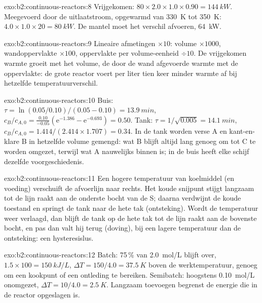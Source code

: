 \begin{solution}{exo:b2:continuous-reactors:8}
Vrijgekomen: $80 \times 2.0 \times 1.0 \times 0.90 = \qty{144}{kW}$. Meegevoerd door de
uitlaatstroom, opgewarmd van \qty{330}{K} tot \qty{350}{K}: $4.0 \times 1.0 \times 20 =
\qty{80}{kW}$. De mantel moet het verschil afvoeren, \qty{64}{kW}.
\end{solution}

\begin{solution}{exo:b2:continuous-reactors:9}
Lineaire afmetingen $\times 10$: volume $\times 1000$, wandoppervlakte $\times 100$, oppervlakte
per volume-eenheid $\div 10$. De vrijgekomen warmte groeit met het volume, de
door de wand afgevoerde warmte met de oppervlakte: de grote reactor voert per liter
tien keer minder warmte af bij hetzelfde temperatuurverschil.
\end{solution}

\begin{solution}{exo:b2:continuous-reactors:10}
Buis: $\tau = \ln(0.05/0.10)/(0.05 - 0.10) = \qty{13.9}{min}$, $c_B/c_{A,0} =
\frac{0.10}{-0.05}(\mathrm e^{-1.386} - \mathrm e^{-0.693}) = 0.50$. Tank: $\tau =
1/\sqrt{0.005} = \qty{14.1}{min}$, $c_B/c_{A,0} = 1.414/(2.414 \times 1.707) =
0.34$. In de tank worden verse A en kant-en-klare B in hetzelfde volume gemengd: wat
B blijft altijd lang genoeg om tot C te worden omgezet, terwijl wat A nauwelijks
binnen is; in de buis heeft elke schijf dezelfde voorgeschiedenis.
\end{solution}

\begin{solution}{exo:b2:continuous-reactors:11}
Een hogere temperatuur van koelmiddel (en voeding) verschuift de afvoerlijn naar
rechts. Het koude snijpunt stijgt langzaam tot de lijn raakt aan
de onderste bocht van de S; daarna verdwijnt de koude toestand en springt de tank
naar de hete tak (ontsteking). Wordt de temperatuur weer verlaagd, dan blijft de tank
op de hete tak tot de lijn raakt aan de bovenste bocht, en pas
dan valt hij terug (doving), bij een lagere temperatuur dan de ontsteking: een
hysteresislus.
\end{solution}

\begin{solution}{exo:b2:continuous-reactors:12}
Batch: 75\,\% van \qty{2.0}{mol/L} blijft over, $1.5 \times 100 = \qty{150}{kJ/L}$,
$\Delta T = 150/4.0 = \qty{37.5}{K}$ boven de werktemperatuur, genoeg om
een kookpunt of een ontleding te bereiken. Semibatch: hoogstens
\qty{0.10}{mol/L} onomgezet, $\Delta T = 10/4.0 = \qty{2.5}{K}$. Langzaam toevoegen
begrenst de energie die in de reactor opgeslagen is.
\end{solution}

